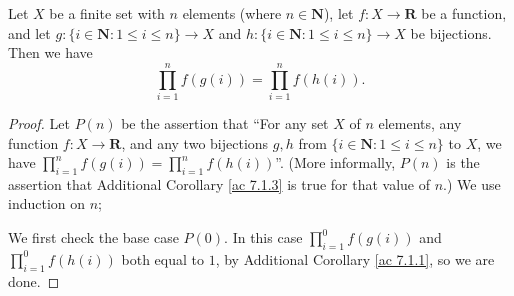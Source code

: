 \begin{additional corollary}\label{ac 7.1.4}
Let \(X\) be a finite set with \(n\) elements (where \(n \in \mathbf{N}\)), let \(f : X \to \mathbf{R}\) be a function, and let \(g : \{i \in \mathbf{N} : 1 \leq i \leq n\} \to X\) and \(h : \{i \in \mathbf{N} : 1 \leq i \leq n\} \to X\) be bijections.
Then we have
\[
    \prod_{i = 1}^n f(g(i)) = \prod_{i = 1}^n f(h(i)).
\]
\end{additional corollary}

\begin{proof}
    Let \(P(n)\) be the assertion that ``For any set \(X\) of \(n\) elements, any function \(f : X \to \mathbf{R}\), and any two bijections \(g, h\) from \(\{i \in \mathbf{N} : 1 \leq i \leq n\}\) to \(X\), we have \(\prod_{i = 1}^n f(g(i)) = \prod_{i = 1}^n f(h(i))\)''.
    (More informally, \(P(n)\) is the assertion that Additional Corollary \ref{ac 7.1.3} is true for that value of \(n\).)
    We use induction on \(n\);

    We first check the base case \(P(0)\).
    In this case \(\prod_{i = 1}^0 f(g(i))\) and \(\prod_{i = 1}^0 f(h(i))\) both equal to \(1\), by Additional Corollary \ref{ac 7.1.1}, so we are done.


\end{proof}
